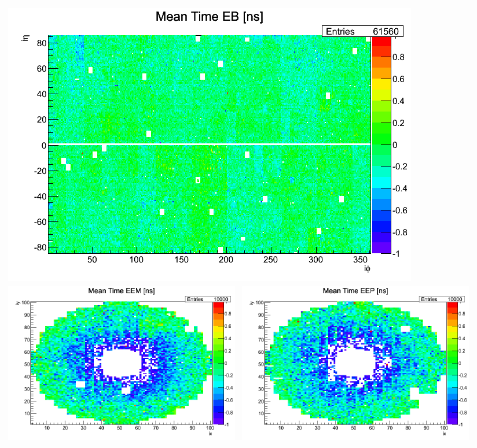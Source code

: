 \vspace{5mm}
\begin{minipage}{0.90\linewidth}
\begin{center}
\mbox{\includegraphics[height=0.50\textwidth, width=0.80\textwidth]{THESISPLOTS/calibDiffMapEB_Before_Calibration.png}}
\mbox{\includegraphics[height=0.52\textwidth, width=0.45\textwidth]{THESISPLOTS/calibDiffMapEEM_Before_CALIB.png} \quad
\includegraphics[height=0.52\textwidth, width=0.45\textwidth]{THESISPLOTS/calibDiffMapEEP_Before_CALIB.png}
}
\label{fig:TimeCalibb4}
\end{center}
\end{minipage}
\vspace{5mm}

